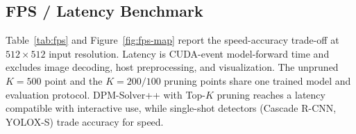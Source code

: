 \documentclass[journal,10pt]{IEEEtran}
\theoremstyle{definition}
\begin{document}
\subsection{FPS / Latency Benchmark}\label{sec:exp-fps}

Table~\ref{tab:fps} and Figure~\ref{fig:fps-map} report the speed-accuracy
trade-off at $512{\times}512$ input resolution. Latency is CUDA-event
model-forward time and excludes image decoding, host preprocessing, and
visualization. The unpruned $K=500$ point and the $K=200/100$ pruning points
share one trained model and evaluation protocol. DPM-Solver++
with Top-$K$ pruning reaches a latency compatible with interactive use, while
single-shot detectors (Cascade R-CNN, YOLOX-S) trade accuracy for speed.

\begin{table}[t]
  \centering
  \footnotesize
  \setlength{\tabcolsep}{3pt}
  \caption{Same-hardware model-forward latency benchmark on Dataset~2 at
  $512\times512$ resolution (RTX A6000, batch size 1, 10 warm-up and 500
  timed CUDA-event iterations). Accuracy follows the prespecified final protocol;
  only latency is hardware-dependent.}
  \label{tab:fps}
\end{table}
\end{document}
